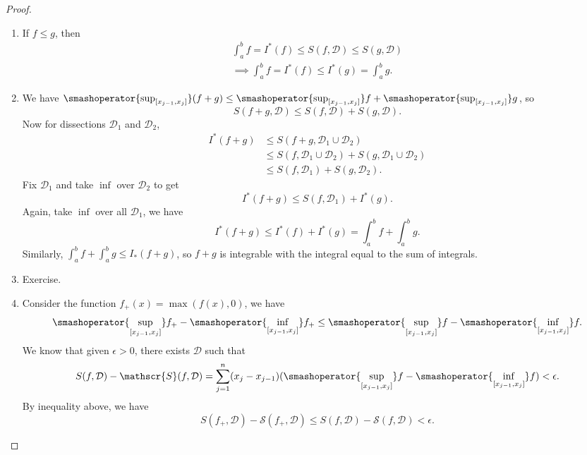 \begin{proof}
    \begin{enumerate}
        \item If \(f\leq g\), then
        \begin{align*}
            \int_a^b f = I^*(f) \leq S(f, \mathcal{D}) \leq S(g, \mathcal{D})\\
            \implies \int^b_a f = I^*(f) \leq I^*(g) = \int^b_a g.
        \end{align*}
        \item We have \(\smashoperator{\sup_{[x_{j-1},x_j]}}(f+g) \leq \smashoperator{\sup_{[x_{j-1},x_j]}}f + \smashoperator{\sup_{[x_{j-1},x_j]}}g\), so
        \[
            S(f + g, \mathcal{D}) \leq S(f, \mathcal{D}) + S(g, \mathcal{D}).
        \]
        Now for dissections \(\mathcal{D}_1\) and \(\mathcal{D}_2\),
        \begin{align*}
            I^*(f + g) &\leq S(f + g, \mathcal{D}_1 \cup \mathcal{D}_2)\\
            &\leq S(f, \mathcal{D}_1 \cup \mathcal{D}_2) + S(g, \mathcal{D}_1\cup \mathcal{D}_2)\\
            &\leq S(f,\mathcal{D}_1) + S(g, \mathcal{D}_2).
        \end{align*}
        Fix \(\mathcal{D}_1\) and take \(\inf\) over \(\mathcal{D}_2\) to get
        \[
            I^*(f + g) \leq S(f, \mathcal{D}_1) + I^*(g).
        \]
        Again, take \(\inf\) over all \(\mathcal{D}_1\), we have
        \[
            I^*(f + g) \leq I^*(f) + I^*(g) = \int^b_a f + \int^b_a g.
        \]
        Similarly, \(\int^b_a f + \int^b_a g\leq I_*(f + g)\), so \(f + g\) is integrable with the integral equal to the sum of integrals.
        \item Exercise.
        \item Consider the function \(f_+(x) = \max(f(x),0)\), we have
        \[
            \smashoperator{\sup_{[x_{j-1},x_j]}}f_+ - \smashoperator{\inf_{[x_{j-1},x_j]}}f_+\leq \smashoperator{\sup_{[x_{j-1},x_j]}}f - \smashoperator{\inf_{[x_{j-1},x_j]}}f.
        \]
        We know that given \(\epsilon>0\), there exists \(\mathcal{D}\) such that
        \[
            S(f, \mathcal{D}) - \mathscr{S}(f,\mathcal{D}) = \sum_{j = 1}^{n} (x_j - x_{j-1})(\smashoperator{\sup_{[x_{j-1},x_j]}}f - \smashoperator{\inf_{[x_{j-1},x_j]}}f) < \epsilon.
        \]
        By inequality above, we have
        \[
            S(f_+, \mathcal{D}) - \mathscr{S}(f_+,\mathcal{D}) \leq S(f, \mathcal{D}) - \mathscr{S}(f,\mathcal{D}) < \epsilon.
        \]

\end{enumerate}
\end{proof}
